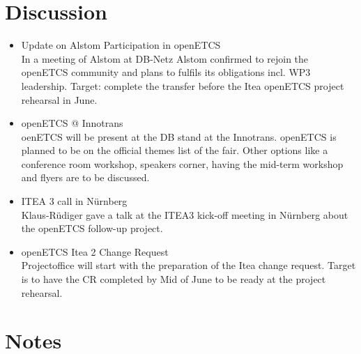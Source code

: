\documentclass[a4paper, 11pt]{article}
\begin{document}
\section{Discussion}
\begin{itemize}

\item Update on Alstom Participation in openETCS\\
In a meeting of Alstom at DB-Netz Alstom confirmed to rejoin the openETCS community and plans to fulfils its obligations incl. WP3 leadership. Target: complete the transfer before the Itea openETCS project rehearsal in June.

\item openETCS @ Innotrans\\
oenETCS will be present at the DB stand at the Innotrans. openETCS  is planned to be on the official themes list of the fair. Other options like a conference room workshop, speakers corner, having the mid-term workshop  and flyers are to be discussed.\\

\item ITEA 3 call in N\"urnberg\\
Klaus-R\"udiger gave a talk at the ITEA3 kick-off meeting in N\"urnberg about the openETCS follow-up project.

\item openETCS Itea 2 Change Request\\
Projectoffice will start with the preparation of the Itea change request. Target is to have the CR completed by Mid of June to be ready at the project rehearsal. 

\end{itemize}

\section{Notes}
\end{document}
